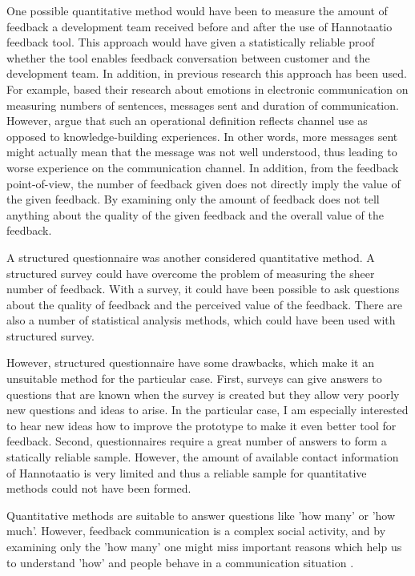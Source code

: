 \documentclass[english,12pt,a4paper,pdftex]{article}
\begin{document}
One possible quantitative method would have been to measure the amount of feedback a development team received before and after the use of Hannotaatio feedback tool. This approach would have given a statistically reliable proof whether the tool enables feedback conversation between customer and the development team. In addition, in previous research this approach has been used. For example, \citet{rice1987} based their research about emotions in electronic communication on measuring numbers of sentences, messages sent and duration of communication. However, \citet{carlson1999} argue that such an operational definition reflects channel use as opposed to knowledge-building experiences. In other words, more messages sent might actually mean that the message was not well understood, thus leading to worse experience on the communication channel. In addition, from the feedback point-of-view, the number of feedback given does not directly imply the value of the given feedback. By examining only the amount of feedback does not tell anything about the quality of the given feedback and the overall value of the feedback. 

A structured questionnaire was another considered quantitative method. A structured survey could have overcome the problem of measuring the sheer number of feedback. With a survey, it could have been possible to ask questions about the quality of feedback and the perceived value of the feedback. There are also a number of statistical analysis methods, which could have been used with structured survey.

However, structured questionnaire have some drawbacks, which make it an unsuitable method for the particular case. First, surveys can give answers to questions that are known when the survey is created but they allow very poorly new questions and ideas to arise. In the particular case, I am especially interested to hear new ideas how to improve the prototype to make it even better tool for feedback. Second, questionnaires require a great number of answers to form a statically reliable sample. However, the amount of available contact information of Hannotaatio is very limited and thus a reliable sample for quantitative methods could not have been formed.

Quantitative methods are suitable to answer questions like 'how many' or 'how much'. However, feedback communication is a complex social activity, and by examining only the 'how many' one might miss important reasons which help us to understand 'how' and people behave in a communication situation \citep{silverman2009}.
\end{document}
